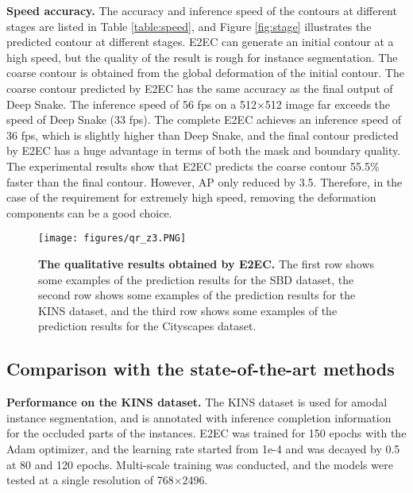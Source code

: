 \documentclass[10pt,twocolumn,letterpaper]{article}
\begin{document}
\textbf{Speed  accuracy.} The accuracy and inference speed of the contours at different stages are listed in Table \ref{table:speed}, and Figure \ref{fig:stage} illustrates the predicted contour at different stages. E2EC can generate an initial contour at a high speed, but the quality of the result is rough for instance segmentation. The coarse contour is obtained from the global deformation of the initial contour. The coarse contour predicted by E2EC has the same accuracy as the final output of Deep Snake. The inference speed of 56 fps on a 512×512 image far exceeds the speed of Deep Snake (33 fps). The complete E2EC achieves an inference speed of 36 fps, which is slightly higher than Deep Snake, and the final contour predicted by E2EC has a huge advantage in terms of both the mask and boundary quality. The experimental results show that E2EC predicts the coarse contour 55.5\% faster than the final contour. However, AP only reduced by 3.5. Therefore, in the case of the requirement for extremely high speed, removing the deformation components can be a good choice.
\begin{figure*}[t]
  \centering\vspace{-5mm}
   \texttt{[image: figures/qr\_z3.PNG]}\vspace{-3mm}
   \caption{\textbf{The qualitative results obtained by E2EC.} The first row shows some examples of the prediction results for the SBD dataset, the second row shows some examples of the prediction results for the KINS dataset, and the third row shows some examples of the prediction results for the Cityscapes dataset.}\vspace{-7mm}
   \label{fig:demo}
\end{figure*}




\vspace{-3mm}\subsection{Comparison with the state-of-the-art methods}\vspace{-2mm}
\textbf{Performance on the KINS dataset.} The KINS dataset is used for amodal instance segmentation, and is annotated with inference completion information for the occluded parts of the instances. E2EC was trained for 150 epochs with the Adam optimizer, and the learning rate started from 1e-4 and was decayed by 0.5 at 80 and 120 epochs. Multi-scale training was conducted, and the models were tested at a single resolution of 768×2496.
\end{document}
